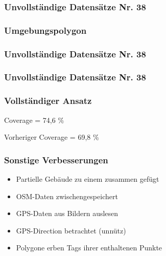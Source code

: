\begin{frame}
  \frametitle{Unvollständige Datensätze \hfill Nr. 38}
\end{frame}


\begin{frame}
  \frametitle{Umgebungspolygon}
\end{frame}


\begin{frame}
  \frametitle{Unvollständige Datensätze \hfill Nr. 38}
\end{frame}

\begin{frame}
  \frametitle{Unvollständige Datensätze \hfill Nr. 38}
\end{frame}


\begin{frame}
  \frametitle{Vollständiger Ansatz}
  \begin{center}
  \huge{Coverage = 74,6 \%}
  \end{center}
  \begin{center}
  Vorheriger Coverage =  69,8 \%
  \end{center}
\end{frame}

\begin{frame}
  \frametitle{Sonstige Verbesserungen}
  \begin{itemize}
    \item<0-> Partielle Gebäude zu einem zusammen gefügt
    \item<1-> OSM-Daten zwischengespeichert
    \item<2-> GPS-Daten aus Bildern auslesen
    \item<3-> GPS-Direction betrachtet (unnütz)
    \item<4-> Polygone erben Tags ihrer enthaltenen Punkte
  \end{itemize}
\end{frame}

